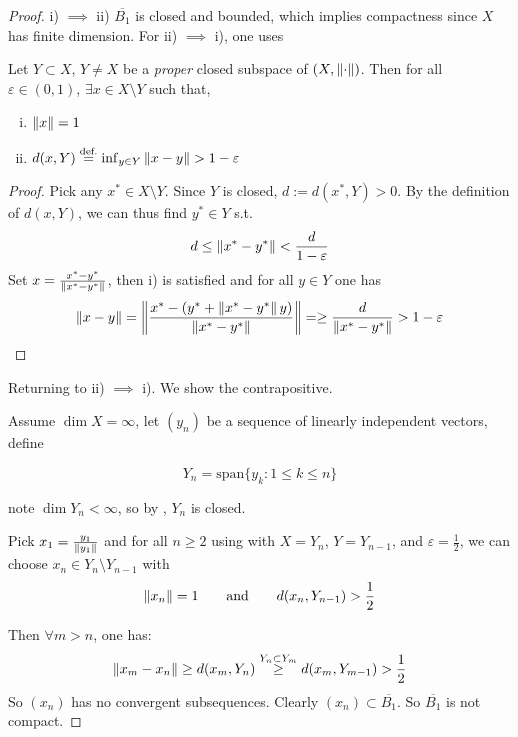 \documentclass{article}
\begin{document}
\begin{proof}
    i) $\implies$ ii) $\overline{B_1}$ is closed and bounded, which implies compactness since $X$ has finite dimension.
    For ii) $\implies$ i), one uses  
\begin{lemma}[Riesz]\nextline
\label{riesz unit ball lemma}
    Let $Y \subset X$, $Y\neq X$ be a \textit{proper} closed subspace of $(X, \left\|{\cdot}\right\|)$. Then for all $\varepsilon \in (0,1)$, $\exists x \in X\setminus Y$ such that,  
    \begin{enumerate}[i)]
        \item $\left\|{x}\right\|=1$
        \item $d(x, Y) \overset{\text{def.}}{=} \inf_{y\in Y} \left\|{x-y}\right\| > 1- \varepsilon$
    \end{enumerate}
\end{lemma}  
\begin{proof}
    Pick any $x^* \in X\setminus Y$. Since $Y$ is closed, $d:=d(x^*, Y)>0$.  
    By the definition of $d(x,Y)$, we can thus find $y^* \in Y$ s.t.  
    $$
    d \leq \left\|{x^*-y^*}\right\| < \frac{d}{1-\varepsilon}
    $$  
    Set $x = \frac{x^*-y^*}{\left\|{x^*-y^*}\right\|}$, then i) is satisfied and for all $y\in Y$ one has  
    $$
    \left\|{x-y}\right\| = \left\|{\frac{x^*-(y^*+\left\|{x^*-y^*}\right\|y)}{\left\|{x^*-y^*}\right\|}}\right\|=
    \geq \frac{d}{\left\|{x^*-y^*}\right\|} > 1-\varepsilon
    $$
\end{proof}

Returning to  ii) $\implies$ i). We show the contrapositive. 

Assume $\dim X=\infty$, let $(y_n)$ be a sequence of linearly independent vectors, define

$$Y_n = \text{span} \{y_k: 1\leq k\leq n\} $$

note $\dim Y_n < \infty$, so by , $Y_n$ is closed.  

Pick $x_1 = \frac{y_1}{\left\|{y_1}\right\|}$ and for all $n \geq 2$ using  with $X=Y_n$, $Y=Y_{n-1}$, and $\varepsilon=\frac{1}{2}$, we can choose $x_n \in Y_n \setminus Y_{n-1}$ with 
$$\left\|{x_n}\right\|=1 \qquad \text{and} \qquad d(x_n, Y_{n-1})>\frac{1}{2}$$

Then $\forall m > n$, one has:  
$$
\left\|{x_m-x_n}\right\| \geq d(x_m, Y_n) \overset{Y_n \subset Y_m}{\geq} d(x_m, Y_{m-1}) > \frac{1}{2}
$$  
So $(x_n)$ has no convergent subsequences. Clearly $(x_n) \subset \overline{B_1} $. So $\overline{B_1} $ is not compact.  
\end{proof}
\end{document}
